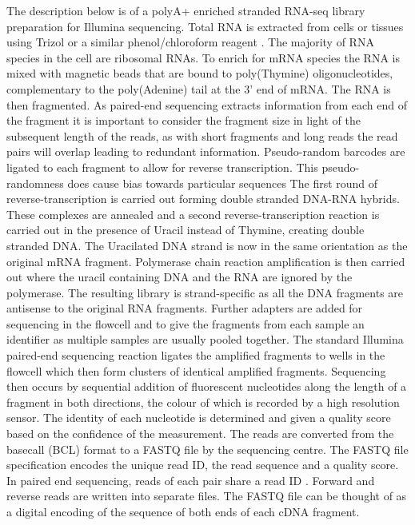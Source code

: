 The description below is of a polyA+ enriched  stranded RNA-seq library preparation for Illumina sequencing.
Total RNA is extracted from cells or tissues using Trizol or a similar phenol/chloroform reagent \citep{Chomczynski1987}. The majority of RNA species in the cell are ribosomal RNAs. 
To enrich for mRNA species the RNA is mixed with magnetic beads that are bound to poly(Thymine) oligonucleotides, complementary to the poly(Adenine) tail at the 3' end of mRNA. 
The RNA is then fragmented. 
As paired-end sequencing extracts information from each end of the fragment it is important to consider the fragment size in light of the subsequent length of the reads, as with short fragments and long reads the read pairs will overlap leading to redundant information. 
Pseudo-random barcodes are ligated to each fragment to allow for reverse transcription. 
This pseudo-randomness does cause bias towards particular sequences %
The first round of reverse-transcription is carried out forming double stranded DNA-RNA hybrids. 
These complexes are annealed and a second reverse-transcription reaction is carried out in the presence of Uracil instead of Thymine, creating double stranded DNA. The Uracilated DNA strand is now in the same orientation as the original mRNA fragment. 
Polymerase chain reaction amplification is then carried out where the uracil containing DNA and the RNA are ignored by the polymerase. 
The resulting library is strand-specific as all the DNA fragments are antisense to the original RNA fragments. Further adapters are added for sequencing in the flowcell and to give the fragments from each sample an identifier as multiple samples are usually pooled together. 
The standard Illumina paired-end sequencing reaction ligates the amplified fragments to wells in the flowcell which then form clusters of identical amplified fragments. Sequencing then occurs by sequential addition of fluorescent nucleotides along the length of a fragment in both directions, the  colour of which is recorded by a high resolution sensor. 
The identity of each nucleotide is determined and given a quality score based on the confidence of the measurement. 
The reads are converted from the basecall (BCL) format to a FASTQ file by the sequencing centre.
The FASTQ file specification \citep{Cock2009} encodes the unique read ID, the read sequence and a quality score. In paired end sequencing, reads of each pair share a read ID . 
Forward and reverse reads are written into separate files.  
The FASTQ file can be thought of as a digital encoding of the sequence of both ends of each cDNA fragment.


